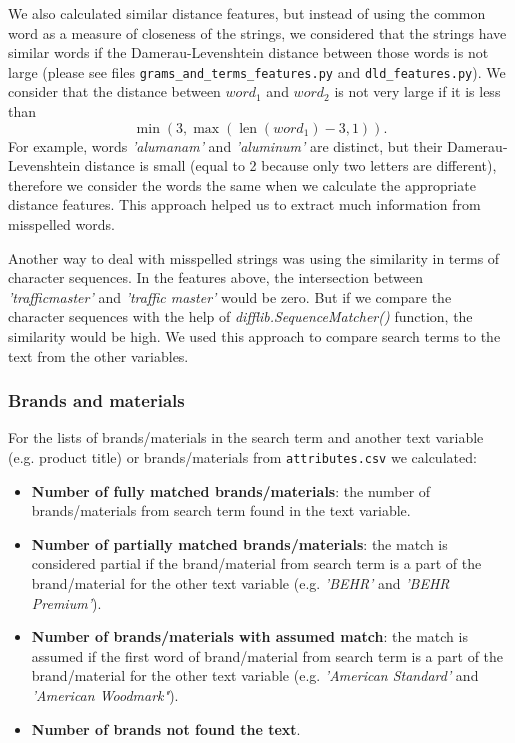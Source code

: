 \documentclass[12pt]{article}
\DeclareMathOperator{\len}{len}
\begin{document}
{{We also calculated similar distance features, but instead of using the common word
as a measure of closeness of the strings, we considered that the strings have similar
words if the Damerau-Levenshtein distance between those words is not large (please see
files \texttt{grams\_and\_terms\_features.py} and \texttt{dld\_features.py}). We consider that the distance between $word_1$ and $word_2$ is not very large if it is less than
 $$\min\left(3,\max\left(\len(word_1)-3,1\right)\right).$$
For example, words \emph{'alumanam'} and \emph{'aluminum'}
are distinct, but their Damerau-Levenshtein distance is small (equal to 2 because only
two letters are different), therefore we consider the words the same when we calculate the
appropriate distance features. This approach helped us to extract much information
from misspelled words.

Another way to deal with misspelled strings was using the similarity in terms of character sequences. In the features above, the intersection between \emph{'trafficmaster'} and \emph{'traffic master'} would be zero. But if we compare the character sequences with the help of \emph{difflib.SequenceMatcher()} function, the similarity would be high. We used this approach to compare search terms to the text from the other variables.

\subsubsection{Brands and materials}
\label{subsubsec:BM_IandK}
For the lists of brands/materials in the search term and another text variable (e.g. product title) or brands/materials from \texttt{attributes.csv} we calculated:
\begin{itemize}
\item \textbf{Number of fully matched brands/materials}: the number of brands/materials from search term found in the text variable.
\item \textbf{Number of partially matched brands/materials}: the match is considered partial if the brand/material from search term is a part of the brand/material for the other text variable (e.g. \emph{'BEHR'} and \emph{'BEHR Premium'}).
\item \textbf{Number of brands/materials with assumed match}: the match is assumed if the first word of brand/material from search term is a part of the brand/material for the other text variable (e.g. \emph{'American Standard'} and \emph{'American Woodmark"}).
\item \textbf{Number of brands not found the text}.
\end{itemize}

}}
\end{document}
